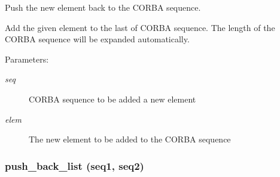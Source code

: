 Push the new element back to the CORBA sequence. 

Add the given element to the last of CORBA sequence. The length of the CORBA sequence will be expanded automatically.

\begin{Desc}
\item[Parameters:]
\begin{description}
\item[{\em seq}]CORBA sequence to be added a new element \item[{\em elem}]The new element to be added to the CORBA sequence\end{description}
\end{Desc}
\subsubsection{\setlength{\rightskip}{0pt plus 5cm}push\_\-back\_\-list (seq1, seq2)}\label{CORBA__SeqUtil_8py_a3}


